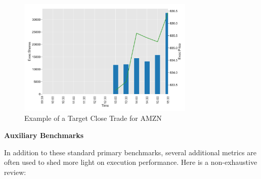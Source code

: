 	\begin{figure}[!ht]
	\centering
	\includegraphics[width=0.75\textwidth]{chapters/chapter_exec_models/figures/close.png} 
	\caption{Example of a Target Close Trade for AMZN \label{fig:close}}
	\end{figure}


\noindent\textbf{Auxiliary Benchmarks} \twomedskip


In addition to these standard primary benchmarks, several additional metrics are often used to shed more light on execution performance. Here is a non-exhaustive review:


